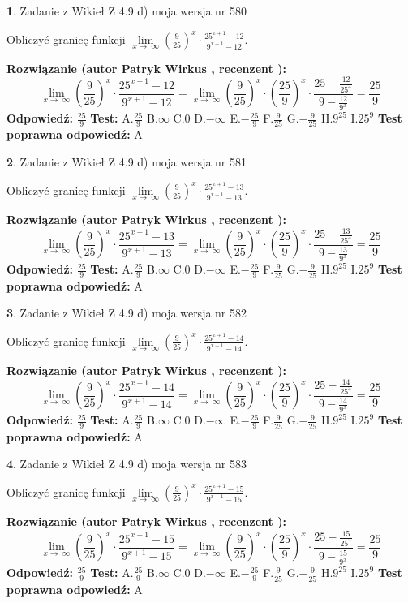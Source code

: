 \documentclass[12pt, a4paper]{article}
\theoremstyle{definition} %
\newtheorem{zad}{}
\newcommand{\zadStart}[1]{\begin{zad}#1\newline}
\newcommand{\zadStop}{\end{zad}}
\newcommand{\rozwStart}[2]{\noindent \textbf{Rozwiązanie (autor #1 , recenzent #2): }\newline}
\newcommand{\rozwStop}{\newline}
\newcommand{\odpStart}{\noindent \textbf{Odpowiedź:}\newline}
\newcommand{\odpStop}{\newline}
\newcommand{\testStart}{\noindent \textbf{Test:}\newline}
\newcommand{\testStop}{\newline}
\newcommand{\kluczStart}{\noindent \textbf{Test poprawna odpowiedź:}\newline}
\newcommand{\kluczStop}{\newline}
\begin{document}
\zadStart{Zadanie z Wikieł Z 4.9 d) moja wersja nr 580}


Obliczyć granicę funkcji  $\lim\limits_{x\to\ \infty}(\frac{9}{25})^{x}\cdot\frac{25^{x+1}-12}{9^{x+1}-12}$.
\zadStop
\rozwStart{Patryk Wirkus}{}
$$\lim\limits_{x\to\ \infty}(\frac{9}{25})^{x}\cdot\frac{25^{x+1}-12}{9^{x+1}-12}=\lim\limits_{x\to\ \infty}(\frac{9}{25})^{x}\cdot(\frac{25}{9})^{x} \cdot \frac{25-\frac{12}{25^{x}}}{9-\frac{12}{9^{x}}} = \frac{25}{9}$$
\rozwStop
\odpStart
$\frac{25}{9}$
\odpStop
\testStart
A.$\frac{25}{9}$ B.$\infty$ C.$0$ D.$-\infty$ E.$-\frac{25}{9}$
F.$\frac{9}{25}$ G.$-\frac{9}{25}$
H.$9^{25}$
I.$25^{9}$
\testStop
\kluczStart
A
\kluczStop



\zadStart{Zadanie z Wikieł Z 4.9 d) moja wersja nr 581}


Obliczyć granicę funkcji  $\lim\limits_{x\to\ \infty}(\frac{9}{25})^{x}\cdot\frac{25^{x+1}-13}{9^{x+1}-13}$.
\zadStop
\rozwStart{Patryk Wirkus}{}
$$\lim\limits_{x\to\ \infty}(\frac{9}{25})^{x}\cdot\frac{25^{x+1}-13}{9^{x+1}-13}=\lim\limits_{x\to\ \infty}(\frac{9}{25})^{x}\cdot(\frac{25}{9})^{x} \cdot \frac{25-\frac{13}{25^{x}}}{9-\frac{13}{9^{x}}} = \frac{25}{9}$$
\rozwStop
\odpStart
$\frac{25}{9}$
\odpStop
\testStart
A.$\frac{25}{9}$ B.$\infty$ C.$0$ D.$-\infty$ E.$-\frac{25}{9}$
F.$\frac{9}{25}$ G.$-\frac{9}{25}$
H.$9^{25}$
I.$25^{9}$
\testStop
\kluczStart
A
\kluczStop



\zadStart{Zadanie z Wikieł Z 4.9 d) moja wersja nr 582}


Obliczyć granicę funkcji  $\lim\limits_{x\to\ \infty}(\frac{9}{25})^{x}\cdot\frac{25^{x+1}-14}{9^{x+1}-14}$.
\zadStop
\rozwStart{Patryk Wirkus}{}
$$\lim\limits_{x\to\ \infty}(\frac{9}{25})^{x}\cdot\frac{25^{x+1}-14}{9^{x+1}-14}=\lim\limits_{x\to\ \infty}(\frac{9}{25})^{x}\cdot(\frac{25}{9})^{x} \cdot \frac{25-\frac{14}{25^{x}}}{9-\frac{14}{9^{x}}} = \frac{25}{9}$$
\rozwStop
\odpStart
$\frac{25}{9}$
\odpStop
\testStart
A.$\frac{25}{9}$ B.$\infty$ C.$0$ D.$-\infty$ E.$-\frac{25}{9}$
F.$\frac{9}{25}$ G.$-\frac{9}{25}$
H.$9^{25}$
I.$25^{9}$
\testStop
\kluczStart
A
\kluczStop



\zadStart{Zadanie z Wikieł Z 4.9 d) moja wersja nr 583}


Obliczyć granicę funkcji  $\lim\limits_{x\to\ \infty}(\frac{9}{25})^{x}\cdot\frac{25^{x+1}-15}{9^{x+1}-15}$.
\zadStop
\rozwStart{Patryk Wirkus}{}
$$\lim\limits_{x\to\ \infty}(\frac{9}{25})^{x}\cdot\frac{25^{x+1}-15}{9^{x+1}-15}=\lim\limits_{x\to\ \infty}(\frac{9}{25})^{x}\cdot(\frac{25}{9})^{x} \cdot \frac{25-\frac{15}{25^{x}}}{9-\frac{15}{9^{x}}} = \frac{25}{9}$$
\rozwStop
\odpStart
$\frac{25}{9}$
\odpStop
\testStart
A.$\frac{25}{9}$ B.$\infty$ C.$0$ D.$-\infty$ E.$-\frac{25}{9}$
F.$\frac{9}{25}$ G.$-\frac{9}{25}$
H.$9^{25}$
I.$25^{9}$
\testStop
\kluczStart
A
\kluczStop
\end{document}
